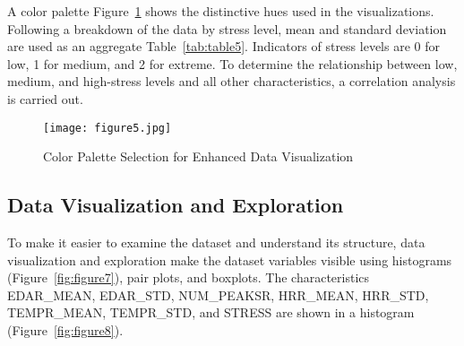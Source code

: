 \documentclass{article}
\begin{document}
A color palette Figure~\ref{fig:figure5} shows the distinctive hues used in the visualizations. Following a breakdown of the data by stress level, mean and standard deviation are used as an aggregate Table~\ref{tab:table5}. Indicators of stress levels are 0 for low, 1 for medium, and 2 for extreme. To determine the relationship between low, medium, and high-stress levels and all other characteristics, a correlation analysis is carried out.

\begin{figure}[htbp]
  \centering
  \texttt{[image: figure5.jpg]}
  \caption{Color Palette Selection for Enhanced Data Visualization}
  \label{fig:figure5}
\end{figure}

\begin{table}[htbp]
\centering
\caption{Sort by Group}
\label{tab:table5}
\end{table}



\subsection{Data Visualization and Exploration }
To make it easier to examine the dataset and understand its structure, data visualization and exploration make the dataset variables visible using histograms (Figure~\ref{fig:figure7}), pair plots, and boxplots. The characteristics EDAR\_MEAN, EDAR\_STD, NUM\_PEAKSR, HRR\_MEAN, HRR\_STD, TEMPR\_MEAN, TEMPR\_STD, and STRESS are shown in a histogram (Figure~\ref{fig:figure8}).
\end{document}
